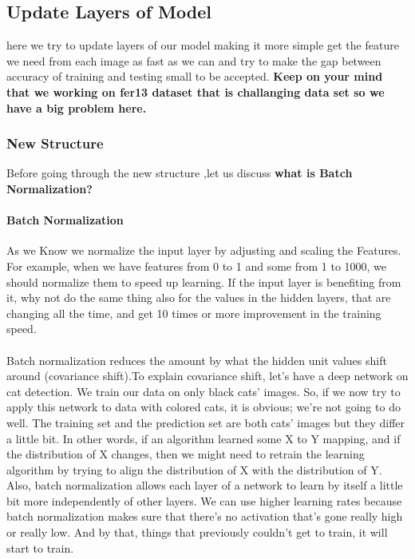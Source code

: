 \subsection{Update Layers of Model}
here we try to update layers of our model making it more simple get the feature we need from each image as fast as we can and try to make the gap between accuracy of training and testing small to be accepted.
\textbf{Keep on your mind that we working on fer13 dataset that is challanging data set so we have a big problem here.}
\subsubsection{New Structure}
Before going through the new structure ,let us discuss
\textbf{what is Batch Normalization?}
\paragraph{Batch Normalization}
As we Know we normalize the input layer by adjusting and scaling the Features. For example, when we have features from 0 to 1 and some from 1 to 1000, we should normalize them to speed up learning. If the input layer is benefiting from it, why not do the same thing also for the values in the hidden layers, that are changing all the time, and get 10 times or more improvement in the training speed.
\paragraph{}
Batch normalization reduces the amount by what the hidden unit values shift around (covariance shift).To explain covariance shift, let’s have a deep network on cat detection. We train our data on only black cats’ images. So, if we now try to apply this network to data with colored cats, it is obvious; we’re not going to do well. The training set and the prediction set are both cats’ images but they differ a little bit. In other words, if an algorithm learned some X to Y mapping, and if the distribution of X changes, then we might need to retrain the learning algorithm by trying to align the distribution of X with the distribution of Y.
Also, batch normalization allows each layer of a network to learn by itself a little bit more independently of other layers.
We can use higher learning rates because batch normalization makes sure that there’s no activation that’s gone really high or really low. And by that, things that previously couldn’t get to train, it will start to train.

